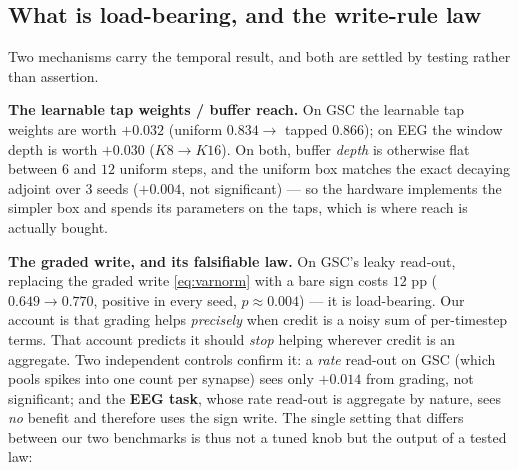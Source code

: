 \documentclass[11pt]{article}
\begin{document}
\hypertarget{what-is-load-bearing-and-the-write-rule-law}{%
\subsection{What is load-bearing, and the write-rule
law}\label{what-is-load-bearing-and-the-write-rule-law}}

Two mechanisms carry the temporal result, and both are settled by
testing rather than assertion.

\textbf{The learnable tap weights / buffer reach.} On GSC the learnable
tap weights are worth \(+0.032\) (uniform \(0.834 \to\) tapped
\(0.866\)); on EEG the window depth is worth \(+0.030\) (\(K8\to K16\)).
On both, buffer \emph{depth} is otherwise flat between \(6\) and \(12\)
uniform steps, and the uniform box matches the exact decaying adjoint
over \(3\) seeds (\(+0.004\), not significant) --- so the hardware
implements the simpler box and spends its parameters on the taps, which
is where reach is actually bought.

\textbf{The graded write, and its falsifiable law.} On GSC's leaky
read-out, replacing the graded write \eqref{eq:varnorm} with a bare sign
costs \(12\) pp (\(0.649 \to 0.770\), positive in every seed,
\(p\approx0.004\)) --- it is load-bearing. Our account is that grading
helps \emph{precisely} when credit is a noisy sum of per-timestep terms.
That account predicts it should \emph{stop} helping wherever credit is
an aggregate. Two independent controls confirm it: a \emph{rate}
read-out on GSC (which pools spikes into one count per synapse) sees
only \(+0.014\) from grading, not significant; and the \textbf{EEG
task}, whose rate read-out is aggregate by nature, sees \emph{no}
benefit and therefore uses the sign write. The single setting that
differs between our two benchmarks is thus not a tuned knob but the
output of a tested law:
\end{document}
